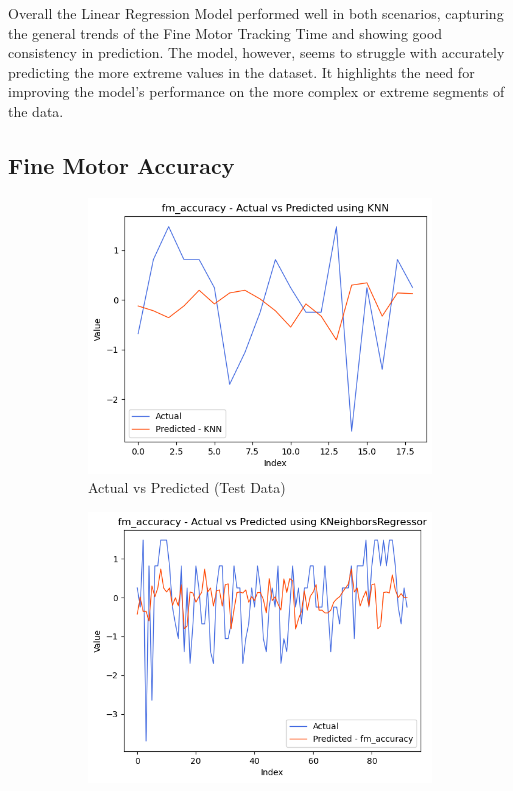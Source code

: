 Overall the Linear Regression Model performed well in both scenarios, capturing the general trends of the Fine Motor Tracking Time and showing good consistency in prediction.
The model, however, seems to struggle with accurately predicting the more extreme values in the dataset. It highlights the need for improving the model's performance on the more complex
or extreme segments of the data.

\subsection*{Fine Motor Accuracy}

\begin{figure}[htbp]
    \centering
    \begin{subfigure}[b]{0.49\textwidth}
        \centering
        \includegraphics[width=\textwidth]{images/regressionCharts/test_data_fine_motor_accuracy.png}
        \caption{Actual vs Predicted (Test Data)}
        \label{fig:actual_vs_predicted_fm_accuracy_test}
    \end{subfigure}\hfill
    \begin{subfigure}[b]{0.49\textwidth}
        \centering
        \includegraphics[width=\textwidth]{images/regressionCharts/all_data_fine_motor_accuracy.png}

\end{subfigure}
\end{figure}
